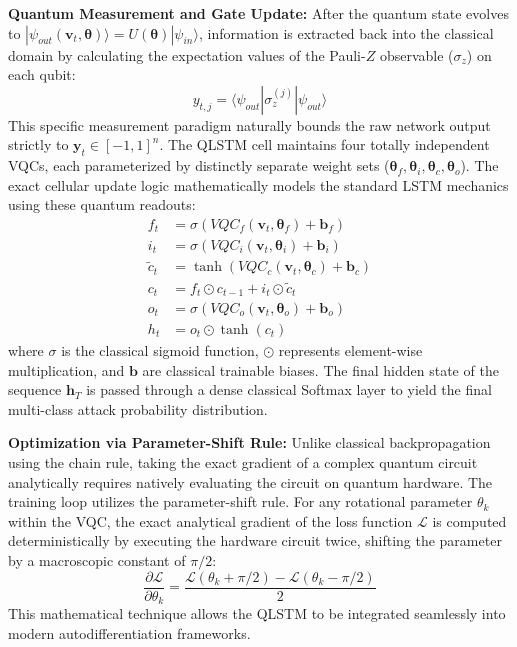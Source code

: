 \documentclass[10pt, journal, letterpaper, twocolumn]{IEEEtran}
\begin{document}
\textbf{Quantum Measurement and Gate Update:}
After the quantum state evolves to $|\psi_{out}(\mathbf{v}_t, \boldsymbol{\theta})\rangle = U(\boldsymbol{\theta}) |\psi_{in}\rangle$, information is extracted back into the classical domain by calculating the expectation values of the Pauli-$Z$ observable ($\sigma_z$) on each qubit:
\begin{equation}
y_{t,j} = \langle \psi_{out} | \sigma_z^{(j)} | \psi_{out} \rangle
\end{equation}
This specific measurement paradigm naturally bounds the raw network output strictly to $\mathbf{y}_t \in [-1, 1]^n$. The QLSTM cell maintains four totally independent VQCs, each parameterized by distinctly separate weight sets ($\boldsymbol{\theta}_f, \boldsymbol{\theta}_i, \boldsymbol{\theta}_c, \boldsymbol{\theta}_o$). The exact cellular update logic mathematically models the standard LSTM mechanics using these quantum readouts:
\begin{align}
f_t &= \sigma \left( VQC_f(\mathbf{v}_t, \boldsymbol{\theta}_f) + \mathbf{b}_f \right) \\
i_t &= \sigma \left( VQC_i(\mathbf{v}_t, \boldsymbol{\theta}_i) + \mathbf{b}_i \right) \\
\tilde{c}_t &= \tanh \left( VQC_c(\mathbf{v}_t, \boldsymbol{\theta}_c) + \mathbf{b}_c \right) \\
c_t &= f_t \odot c_{t-1} + i_t \odot \tilde{c}_t \\
o_t &= \sigma \left( VQC_o(\mathbf{v}_t, \boldsymbol{\theta}_o) + \mathbf{b}_o \right) \\
h_t &= o_t \odot \tanh(c_t)
\end{align}
where $\sigma$ is the classical sigmoid function, $\odot$ represents element-wise multiplication, and $\mathbf{b}$ are classical trainable biases. The final hidden state of the sequence $\mathbf{h}_{T}$ is passed through a dense classical Softmax layer to yield the final multi-class attack probability distribution.

\textbf{Optimization via Parameter-Shift Rule:}
Unlike classical backpropagation using the chain rule, taking the exact gradient of a complex quantum circuit analytically requires natively evaluating the circuit on quantum hardware. The training loop utilizes the parameter-shift rule. For any rotational parameter $\theta_k$ within the VQC, the exact analytical gradient of the loss function $\mathcal{L}$ is computed deterministically by executing the hardware circuit twice, shifting the parameter by a macroscopic constant of $\pi/2$:
\begin{equation}
\frac{\partial \mathcal{L}}{\partial \theta_k} = \frac{\mathcal{L}(\theta_k + \pi/2) - \mathcal{L}(\theta_k - \pi/2)}{2}
\end{equation}
This mathematical technique allows the QLSTM to be integrated seamlessly into modern autodifferentiation frameworks.
\end{document}
